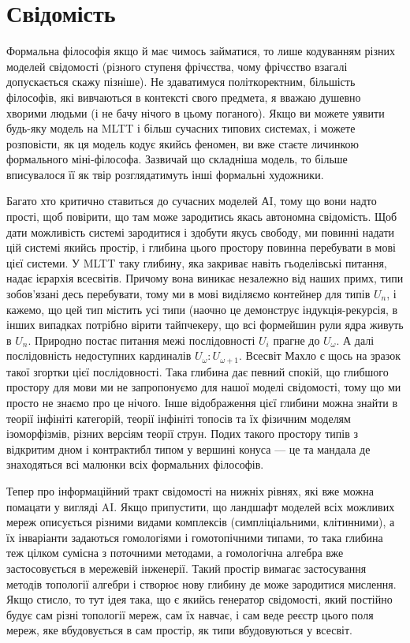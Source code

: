\section{Свідомість}

Формальна філософія якщо й має чимось займатися, то лише кодуванням різних
моделей свідомості (різного ступеня фрічєства, чому фрічєство взагалі
допускається скажу пізніше). Не здаватимуся політкоректним, більшість
філософів, які вивчаються в контексті свого предмета, я вважаю душевно
хворими людьми (і не бачу нічого в цьому поганого). Якщо ви можете уявити
будь-яку модель на MLTT і більш сучасних типових системах, і можете розповісти,
як ця модель кодує якийсь феномен, ви вже стаєте личинкою формального
міні-філософа. Зазвичай що складніша модель, то більше вписувалося її
як твір розглядатимуть інші формальні художники.

Багато хто критично ставиться до сучасних моделей АI, тому що вони
надто прості, щоб повірити, що там може зародитись якась автономна
свідомість. Щоб дати можливість системі зародитися і здобути якусь свободу,
ми повинні надати цій системі якийсь простір, і глибина цього простору
повинна перебувати в мові цієї системи. У MLTT таку глибину, яка закриває
навіть гьоделівські питання, надає ієрархія всесвітів. Причому вона виникає
незалежно від наших примх, типи зобов'язані десь перебувати, тому ми в мові
виділяємо контейнер для типів $U_n$, і кажемо, що цей тип містить усі типи
(наочно це демонструє індукція-рекурсія, в інших випадках потрібно вірити
тайпчекеру, що всі формейшин рули ядра живуть в $U_n$. Природно постає питання
межі послідовності $U_i$ прагне до $U_\omega$. А далі послідовність недоступних
кардиналів $U_\omega: U_{\omega+1}$. Всесвіт Махло є щось на зразок такої згортки цієї
послідовності. Така глибина дає певний спокій, що глибшого простору для
мови ми не запропонуємо для нашої моделі свідомості, тому що ми просто не
знаємо про це нічого. Інше відображення цієї глибини можна знайти в теорії
інфініті категорій, теорії інфініті топосів та їх фізичним моделям ізоморфізмів,
різних версіям теорії струн. Подих такого простору типів з відкритим дном
і контрактибл типом у вершині конуса --- це та мандала де знаходяться всі
малюнки всіх формальних філософів.

Тепер про інформаційний тракт свідомості на нижніх рівнях, які вже можна
помацати у вигляді AI. Якщо припустити, що ландшафт моделей всіх можливих
мереж описується різними видами комплексів (симпліціальними, клітинними),
а їх інваріанти задаються гомологіями і гомотопічними типами, то така
глибина теж цілком сумісна з поточними методами, а гомологічна алгебра
вже застосовується в мережевій інженерії. Такий простір вимагає застосування
методів топології алгебри і створює нову глибину де може зародитися мислення.
Якщо стисло, то тут ідея така, що є якийсь генератор свідомості, який постійно
будує сам різні топології мереж, сам їх навчає, і сам веде реєстр цього поля
мереж, яке вбудовується в сам простір, як типи вбудовуються у всесвіт.

